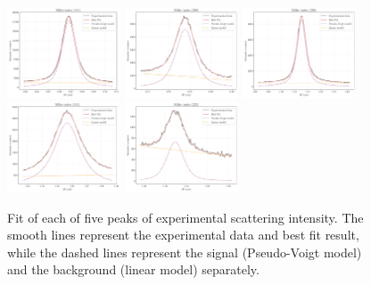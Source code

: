 \documentclass[prb,twocolumn]{revtex4-1}
\begin{document}
\begin{figure}[t!]
    \centering 
    \includegraphics[width=0.3\textwidth]{images/xrd/1_peak.pdf}
    \hskip 0.01mm
    \includegraphics[width=0.3\textwidth]{images/xrd/2_peak.pdf}
    \hskip 0.01mm
   \includegraphics[width=0.3\textwidth]{images/xrd/3_peak.pdf}
   \\
   \includegraphics[width=0.3\textwidth]{images/xrd/4_peak.pdf}
   \hskip 0.01mm
   \includegraphics[width=0.3\textwidth]{images/xrd/5_peak.pdf}
   
    \caption{Fit of each of five peaks of experimental scattering intensity. The smooth lines represent the experimental data and best fit result, while the dashed lines represent the signal (Pseudo-Voigt model) and the background (linear model) separately.}
    \label{fig:peaks}
\end{figure}
\end{document}
